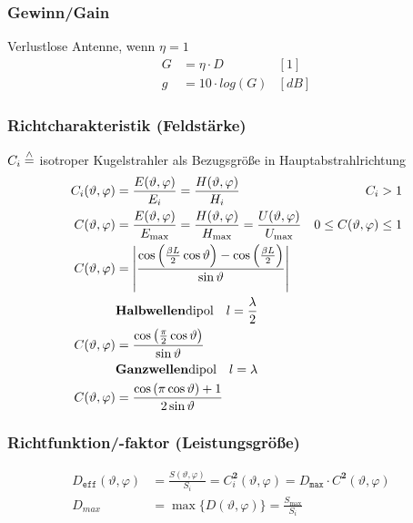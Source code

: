 \subsubsection{Gewinn/Gain}
Verlustlose Antenne, wenn $ \eta = 1 $
\begin{align*}
	G & = \eta \cdot D & [1]\\
    g &= 10 \cdot log(G) & [\si{dB}]
\end{align*}

\subsubsection{Richtcharakteristik (Feldstärke)}
$C_{i} \stackrel{\wedge}{=}$ isotroper Kugelstrahler als Bezugsgröße in Hauptabstrahlrichtung
\begin{align*}
	C_{i}(\vartheta, \varphi) & = \frac{E(\vartheta, \varphi)}{E_{i}}=\frac{H(\vartheta, \varphi)}{H_{i}}                                               & C_{i}>1                             \\
	C(\vartheta, \varphi)     & = \frac{E(\vartheta, \varphi)}{E_{\max}}=\frac{H(\vartheta, \varphi)}{H_{\max}} = \frac{U(\vartheta,\varphi)}{U_{\max}} & 0 \leq C(\vartheta, \varphi) \leq 1 \\
	C(\vartheta, \varphi)     & = \left|\frac{\cos\left(\frac{\beta L}{2}\cos\vartheta\right)-\cos\left(\frac{\beta L}{2}\right)}{\sin\vartheta}\right| \\
	                          & \text{\textbf{Halbwellen}dipol}\quad l=\frac{\lambda}{2} \\
	C(\vartheta, \varphi)     & = \frac{\cos\left(\frac{\pi}{2}\cos\vartheta\right)}{\sin\vartheta}    \\
	                          & \text{\textbf{Ganzwellen}dipol}\quad l=\lambda           \\ 
    C(\vartheta, \varphi)     &= \frac{\cos\left(\pi\cos\vartheta\right)+1}{2\sin\vartheta}
\end{align*}

\subsubsection{Richtfunktion/-faktor (Leistungsgröße)} 
\begin{align*}
	D_{\texttt{eff}}(\vartheta, \varphi) & = \frac{S(\vartheta, \varphi)}{S_{i}} = C^\mathbf{2}_i(\vartheta, \varphi) = D_{\texttt{max}} \cdot C^\mathbf{2}(\vartheta, \varphi) & \\
	D_{max}                              & = \max \{D(\vartheta, \varphi)\} = \frac{S_{\max}}{S_{i}}                                                                            &
\end{align*}

